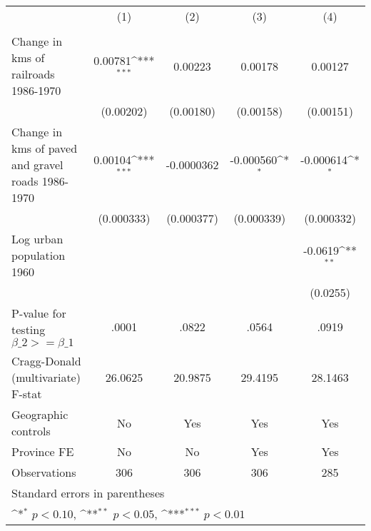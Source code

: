 {
\def\sym#1{\ifmmode^{#1}\else\(^{#1}\)\fi}
\begin{tabular}{l*{4}{c}}
\hline\hline
                &\multicolumn{1}{c}{(1)}&\multicolumn{1}{c}{(2)}&\multicolumn{1}{c}{(3)}&\multicolumn{1}{c}{(4)}\\
                &\multicolumn{1}{c}{}&\multicolumn{1}{c}{}&\multicolumn{1}{c}{}&\multicolumn{1}{c}{}\\
\hline
Change in kms of railroads 1986-1970&  0.00781\sym{***}&  0.00223         &  0.00178         &  0.00127         \\
                &(0.00202)         &(0.00180)         &(0.00158)         &(0.00151)         \\
[1em]
Change in kms of paved and gravel roads 1986-1970&  0.00104\sym{***}&-0.0000362         &-0.000560\sym{*}  &-0.000614\sym{*}  \\
                &(0.000333)         &(0.000377)         &(0.000339)         &(0.000332)         \\
[1em]
Log urban population 1960&                  &                  &                  &  -0.0619\sym{**} \\
                &                  &                  &                  & (0.0255)         \\
\hline
P-value for testing $\beta\_{2} >= \beta\_{1}$&    .0001         &    .0822         &    .0564         &    .0919         \\
Cragg-Donald (multivariate) F-stat&  26.0625         &  20.9875         &  29.4195         &  28.1463         \\
Geographic controls&       No         &      Yes         &      Yes         &      Yes         \\
Province FE     &       No         &       No         &      Yes         &      Yes         \\
Observations    &      306         &      306         &      306         &      285         \\
\hline\hline
\multicolumn{5}{l}{\footnotesize Standard errors in parentheses}\\
\multicolumn{5}{l}{\footnotesize \sym{*} \(p<0.10\), \sym{**} \(p<0.05\), \sym{***} \(p<0.01\)}\\
\end{tabular}
}
